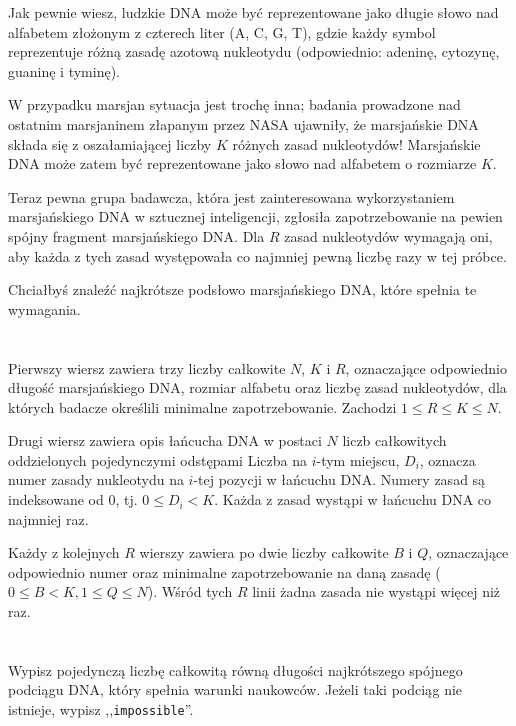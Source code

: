 \ifx\boi\undefined\fi
\def\version{jury-1}
Jak pewnie wiesz, ludzkie DNA może być reprezentowane jako długie słowo nad
alfabetem złożonym z czterech liter ({A, C, G, T}), gdzie każdy symbol reprezentuje
różną zasadę azotową nukleotydu (odpowiednio: adeninę, cytozynę, guaninę i tyminę).

W przypadku marsjan sytuacja jest trochę inna; badania prowadzone nad ostatnim
marsjaninem złapanym przez NASA ujawniły, że marsjańskie DNA składa się z oszałamiającej
liczby $K$ różnych zasad nukleotydów! Marsjańskie DNA może zatem być reprezentowane
jako słowo nad alfabetem o rozmiarze $K$.

Teraz pewna grupa badawcza, która jest zainteresowana wykorzystaniem marsjańskiego DNA
w sztucznej inteligencji, zgłosiła zapotrzebowanie na pewien spójny fragment marsjańskiego DNA.
Dla $R$ zasad nukleotydów wymagają oni, aby każda z tych zasad występowała co najmniej pewną liczbę razy w tej próbce.

Chciałbyś znaleźć najkrótsze podsłowo marsjańskiego DNA, które spełnia te wymagania.

\section*{}
Pierwszy wiersz zawiera trzy liczby całkowite $N$, $K$ i $R$, oznaczające
odpowiednio długość marsjańskiego DNA, rozmiar alfabetu oraz liczbę zasad nukleotydów,
dla których badacze określili minimalne zapotrzebowanie. Zachodzi $1 \le R \le K \le N$.

Drugi wiersz zawiera opis łańcucha DNA w postaci $N$ liczb całkowitych oddzielonych
pojedynczymi odstępami
Liczba na $i$-tym miejscu, $D_i$, oznacza numer zasady nukleotydu na $i$-tej pozycji w łańcuchu DNA.
Numery zasad są indeksowane od $0$, tj. $0 \leq D_i < K$. Każda z zasad wystąpi w łańcuchu DNA
co najmniej raz.

Każdy z kolejnych $R$ wierszy zawiera po dwie liczby całkowite $B$ i $Q$, oznaczające odpowiednio
numer oraz minimalne zapotrzebowanie na daną zasadę ($0 \le B < K, 1 \le Q \le N$).
Wśród tych $R$ linii żadna zasada nie wystąpi więcej niż raz.

\section*{\outputsection}
Wypisz pojedynczą liczbę całkowitą równą długości najkrótszego spójnego podciągu DNA,
który spełnia warunki naukowców. Jeżeli taki podciąg nie istnieje,
wypisz ,,\texttt{impossible}''.


